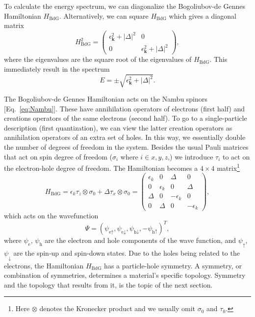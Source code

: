 To calculate the energy spectrum, we can diagonalize the Bogoliubov-de Gennes Hamiltonian $H_{\textrm{BdG}}$.
Alternatively, we can square $H_{\textrm{BdG}}$ which gives a diagonal matrix
\begin{equation}
H_{\textrm{BdG}}^{2}=\left(\begin{array}{cc}
\epsilon_{\bm{k}}^{2}+\left|\Delta\right|^{2} & 0\\
0 & \epsilon_{\bm{k}}^{2}+\left|\Delta\right|^{2}
\end{array}\right),
\end{equation}
where the eigenvalues are the square root of the eigenvalues of $H_{\textrm{BdG}}$.
This immediately result in the spectrum
\begin{equation}
E=\pm\sqrt{\epsilon_{\bm{k}}^{2}+\left|\Delta\right|^{2}}.\label{eq:SC_spectrum}
\end{equation}

The Bogoliubov-de Gennes Hamiltonian acts on the Nambu spinors [Eq.~\eqref{eq:Nambu}].
These have annihilation operators of electrons (first half) and creations operators of the same electrons (second half).
To go to a single-particle description (first quantization), we can view the latter creation operators as annihilation operators of an extra set of holes.
In this way, we essentially double the number of degrees of freedom in the system.
Besides the usual Pauli matrices that act on spin degree of freedom ($\sigma_{i}$ where $i\in x,y,z$,) we introduce $\tau_{i}$ to act on the electron-hole degree of freedom.
The Hamiltonian becomes a $4\times4$ matrix\footnote{Here $\otimes$ denotes the Kronecker product and we usually omit $\sigma_{0}$ and $\tau_{0}$.}
\begin{equation}
H_{\textrm{BdG}}=\epsilon_{k}\tau_{z}\otimes\sigma_{0}+\Delta\tau_{x}\otimes\sigma_{0}=\left(\begin{array}{cccc}
\epsilon_{k} & 0 & \Delta & 0\\
0 & \epsilon_{k} & 0 & \Delta\\
\Delta & 0 & -\epsilon_{k} & 0\\
0 & \Delta & 0 & -\epsilon_{k}
\end{array}\right),\label{eq:H_BdG_sc}
\end{equation}
which acts on the wavefunction
\begin{equation}
\Psi=\left(\psi_{\textrm{e}\uparrow},\psi_{\textrm{e}\downarrow},\psi_{\textrm{h}\downarrow},-\psi_{\textrm{h}\uparrow}\right)^{T},\label{eq:4wf}
\end{equation}
where $\psi_{\textrm{e}}$, $\psi_{\textrm{h}}$ are the electron and hole components of the wave function, and $\psi_{\uparrow}$, $\psi_{\downarrow}$ are the spin-up and spin-down states.
Due to the holes being related to the electrons, the Hamiltonian $H_{\textrm{BdG}}$ has a particle-hole symmetry.
A symmetry, or combination of symmetries, determines a material's specific topology.
Symmetry and the topology that results from it, is the topic of the next section.

